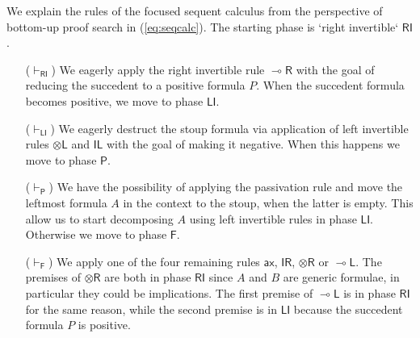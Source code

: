 \documentclass[submission,copyright,creativecommons]{eptcs}
\theoremstyle{definition}
\newcommand{\tl}{\otimes \mathsf{L}}
\newcommand{\tr}{\otimes \mathsf{R}}
\newcommand{\lright}{{\multimap}\mathsf{R}}
\newcommand{\lleft}{{\multimap}\mathsf{L}}
\newcommand{\pass}{\mathsf{pass}}
\newcommand{\unitl}{\mathsf{IL}}
\newcommand{\unitr}{\mathsf{IR}}
\newcommand{\ax}{\mathsf{ax}}
\newcommand{\RI}{\mathsf{RI}}
\newcommand{\LI}{\mathsf{LI}}
\newcommand{\Pass}{\mathsf{P}}
\newcommand{\F}{\mathsf{F}}
\begin{document}
We explain the rules of the focused sequent calculus from the perspective of bottom-up proof search in (\ref{eq:seqcalc}). The starting phase is `right invertible` $\RI$. %
\begin{itemize}
\item[($\vdash_\RI$)] We eagerly apply the right invertible rule $\lright$ with the goal of reducing the succedent to a positive formula $P$.
  When the succedent formula becomes positive, we move to phase $\LI$.
\item[($\vdash_\LI$)] We eagerly destruct the stoup formula via application of left invertible rules $\tl$ and $\unitl$ with the goal of making it negative. When this happens we move to phase $\Pass$.
\item[($\vdash_\Pass$)] We have the possibility of applying the passivation rule and move the leftmost formula $A$ in the context to the stoup, when the latter is empty. This allow us to start decomposing $A$ using left invertible rules in phase $\LI$. Otherwise we move to phase $\F$.
\item[($\vdash_\F$)] We apply one of the four remaining rules $\ax$, $\unitr$, $\tr$ or $\lleft$. The premises of $\tr$ are both in phase $\RI$ since $A$ and $B$ are generic formulae, in particular they could be implications. The first premise of $\lleft$ is in phase $\RI$ for the same reason, while the second premise is in $\LI$ because the succedent formula $P$ is positive.
\end{itemize}
\end{document}
